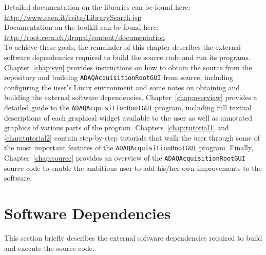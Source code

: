 Detailed documentation on the \CAEN libraries can be found here:\\
\href{http://www.caen.it/csite/LibrarySearch.jsp}{http://www.caen.it/csite/LibrarySearch.jsp}\\

Documentation on the \ROOT toolkit can be found here:\\
\href{http://root.cern.ch/drupal/content/documentation}{http://root.cern.ch/drupal/content/documentation}\\

To achieve these goals, the remainder of this chapter describes the
external software dependencies required to build the \ADAQ source code
and run its programs. Chapter~\ref{chap:svn} provides instructions on
how to obtain the \ADAQ source from the \GIT repository and building
\texttt{ADAQAcquisitionRootGUI} from source, including configuring the user's
Linux environment and some notes on obtaining and building the
external software dependencies. Chapter~\ref{chap:overview} provides a
detailed guide to the \texttt{ADAQAcquisitionRootGUI} program, including full
textual descriptions of each graphical widget available to the user as
well as annotated graphics of various parts of the
program. Chapters~\ref{chap:tutorial1} and \ref{chap:tutorial2}
contain step-by-step tutorials that walk the user through some of the
most important features of the \texttt{ADAQAcquisitionRootGUI} program. Finally,
Chapter~\ref{chap:source} provides an overview of the
\texttt{ADAQAcquisitionRootGUI} source code to enable the ambitious user to add
his/her own improvements to the software.

    
\section{Software Dependencies}
\label{sec: dep}
This section briefly describes the external software dependencies
required to build and execute the \ADAQ source code.

